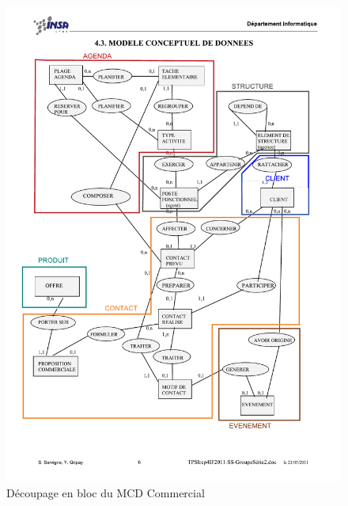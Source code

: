 \begin{figure}[H]
	\begin{center}
		\includegraphics[scale=0.8,clip, trim = 5mm 30mm 3mm 30mm]{Includes/SOA-Blocs-2.pdf}
		\caption{Découpage en bloc du MCD Commercial}
	\end{center}
\end{figure}
